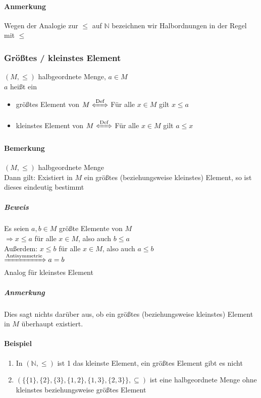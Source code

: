 \documentclass[a4paper]{scrartcl}
\theoremstyle{definition}
\theoremstyle{plain}
\theoremstyle{plain}
\theoremstyle{remark}
\theoremstyle{remark}
\theoremstyle{remark}
\begin{document}
\paragraph{Anmerkung}
\label{sec-2-5-3-2}
Wegen der Analogie zur $\leq$ auf $\mathbb{N}$ bezeichnen wir Halbordnungen in der Regel mit $\leq$
\subsubsection{Größtes / kleinstes Element}
\label{sec-2-5-4}
$(M, \leq)$ halbgeordnete Menge, $a\in M$ \\
    $a$ heißt ein
\begin{itemize}
\item größtes Element von $M\xLeftrightarrow{\text{Def}}$ Für alle $x\in M$ gilt $x\leq a$
\item kleinstes Element von $M\xLeftrightarrow{\text{Def}}$ Für alle $x\in M$ gilt $a\leq x$
\end{itemize}
\paragraph{Bemerkung}
\label{sec-2-5-4-1}
$(M,\leq)$ halbgeordnete Menge \\
     Dann gilt: Existiert in $M$ ein größtes (beziehungsweise kleinstes) Element, so ist dieses eindeutig bestimmt
\subparagraph{Beweis}
\label{sec-2-5-4-1-1}
Es seien $a,b\in M$ größte Elemente von $M$ \\
      $\Rightarrow x\leq a$ für alle $x\in M$, also auch $b\leq a$ \\
      Außerdem: $x \leq b$ für alle $x\in M$, also auch $a\leq b$ \\
      $\xRightarrow{\text{Antisymmetrie}} a = b$ \\
      Analog für kleinstes Element
\subparagraph{Anmerkung}
\label{sec-2-5-4-1-2}
Dies sagt nichts darüber aus, ob ein größtes (beziehungsweise kleinstes) Element in $M$ überhaupt existiert.
\paragraph{Beispiel}
\label{sec-2-5-4-2}
\begin{enumerate}
\item In $(\mathbb{N},\leq)$ ist 1 das kleinste Element, ein größtes Element gibt es nicht
\item $(\{\{1\},\{2\},\{3\},\{1,2\},\{1,3\},\{2,3\}\}, \subseteq)$ ist eine halbgeordnete Menge ohne kleinstes beziehungsweise größtes Element
\end{enumerate}
\end{document}
